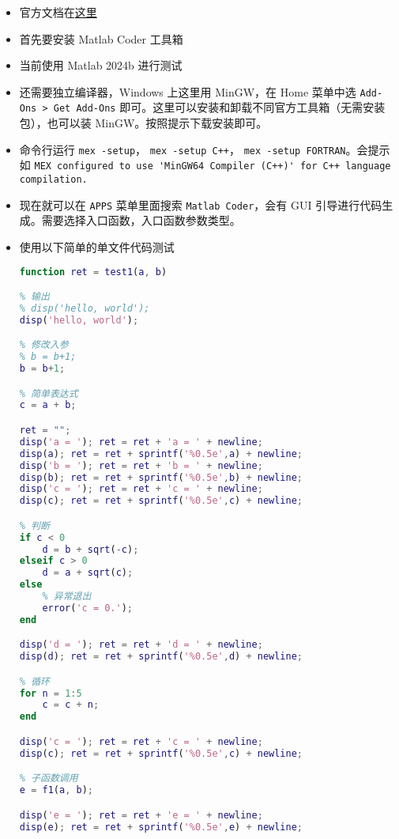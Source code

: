 
\begin{itemize}
\item 官方文档在\href{https://ch.mathworks.com/help/coder/index.html?s_tid=CRUX_lftnav}{这里}
\item 首先要安装 Matlab Coder 工具箱
\item 当前使用 Matlab 2024b 进行测试
\item 还需要独立编译器，Windows 上这里用 MinGW，在 Home 菜单中选 \verb`Add-Ons > Get Add-Ons` 即可。这里可以安装和卸载不同官方工具箱（无需安装包），也可以装 MinGW。按照提示下载安装即可。
\item 命令行运行 \verb`mex -setup`， \verb`mex -setup C++`， \verb`mex -setup FORTRAN`。会提示如 \verb`MEX configured to use 'MinGW64 Compiler (C++)' for C++ language compilation.`
\item 现在就可以在 \verb`APPS` 菜单里面搜索 \verb`Matlab Coder`，会有 GUI 引导进行代码生成。需要选择入口函数，入口函数参数类型。
\item 使用以下简单的单文件代码测试
\begin{lstlisting}[language=matlab,caption=test1.m]
% 代码生成的入口函数，arg* 限制为字符串，ret 限制为非负整数
function ret = test1(a, b)

% 输出
% disp('hello, world');
disp('hello, world');

% 修改入参
% b = b+1;
b = b+1;

% 简单表达式
c = a + b;

ret = "";
disp('a = '); ret = ret + 'a = ' + newline;
disp(a); ret = ret + sprintf('%0.5e',a) + newline;
disp('b = '); ret = ret + 'b = ' + newline;
disp(b); ret = ret + sprintf('%0.5e',b) + newline;
disp('c = '); ret = ret + 'c = ' + newline;
disp(c); ret = ret + sprintf('%0.5e',c) + newline;

% 判断
if c < 0
    d = b + sqrt(-c);
elseif c > 0
    d = a + sqrt(c);
else
    % 异常退出
    error('c = 0.');
end

disp('d = '); ret = ret + 'd = ' + newline;
disp(d); ret = ret + sprintf('%0.5e',d) + newline;

% 循环
for n = 1:5
    c = c + n;
end

disp('c = '); ret = ret + 'c = ' + newline;
disp(c); ret = ret + sprintf('%0.5e',c) + newline;

% 子函数调用
e = f1(a, b);

disp('e = '); ret = ret + 'e = ' + newline;
disp(e); ret = ret + sprintf('%0.5e',e) + newline;


\end{lstlisting}
\end{itemize}
